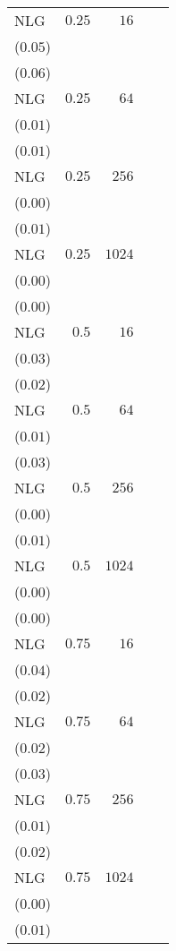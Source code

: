 \begin{table*}[t]
\begin{tabular}{lrrrr}
NLG & \(0.25\) & \(16\) & \longcell{\(0.64\)\\{\tiny(\(0.05\))}} & \longcell{\(0.36\)\\{\tiny(\(0.06\))}} \\[2.2ex]
NLG & \(0.25\) & \(64\) & \longcell{\(0.92\)\\{\tiny(\(0.01\))}} & \longcell{\(0.77\)\\{\tiny(\(0.01\))}} \\[2.2ex]
NLG & \(0.25\) & \(256\) & \longcell{\(0.98\)\\{\tiny(\(0.00\))}} & \longcell{\(0.94\)\\{\tiny(\(0.01\))}} \\[2.2ex]
NLG & \(0.25\) & \(1024\) & \longcell{\(0.99\)\\{\tiny(\(0.00\))}} & \longcell{\(0.97\)\\{\tiny(\(0.00\))}} \\[2.2ex]
NLG & \(0.5\) & \(16\) & \longcell{\(0.55\)\\{\tiny(\(0.03\))}} & \longcell{\(0.27\)\\{\tiny(\(0.02\))}} \\[2.2ex]
NLG & \(0.5\) & \(64\) & \longcell{\(0.87\)\\{\tiny(\(0.01\))}} & \longcell{\(0.67\)\\{\tiny(\(0.03\))}} \\[2.2ex]
NLG & \(0.5\) & \(256\) & \longcell{\(0.98\)\\{\tiny(\(0.00\))}} & \longcell{\(0.91\)\\{\tiny(\(0.01\))}} \\[2.2ex]
NLG & \(0.5\) & \(1024\) & \longcell{\(0.99\)\\{\tiny(\(0.00\))}} & \longcell{\(0.97\)\\{\tiny(\(0.00\))}} \\[2.2ex]
NLG & \(0.75\) & \(16\) & \longcell{\(0.34\)\\{\tiny(\(0.04\))}} & \longcell{\(0.14\)\\{\tiny(\(0.02\))}} \\[2.2ex]
NLG & \(0.75\) & \(64\) & \longcell{\(0.75\)\\{\tiny(\(0.02\))}} & \longcell{\(0.48\)\\{\tiny(\(0.03\))}} \\[2.2ex]
NLG & \(0.75\) & \(256\) & \longcell{\(0.94\)\\{\tiny(\(0.01\))}} & \longcell{\(0.81\)\\{\tiny(\(0.02\))}} \\[2.2ex]
NLG & \(0.75\) & \(1024\) & \longcell{\(0.98\)\\{\tiny(\(0.00\))}} & \longcell{\(0.94\)\\{\tiny(\(0.01\))}} \\[2.2ex]

\end{tabular}
\end{table*}

